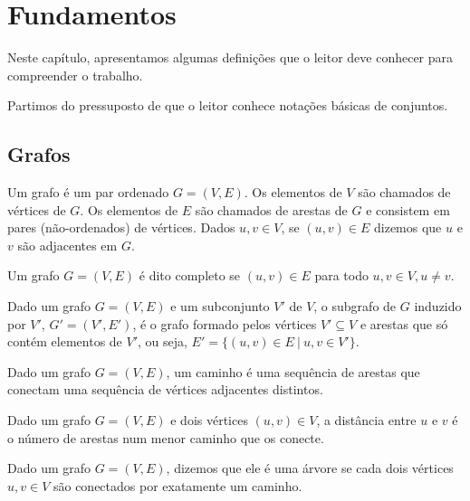 \chapter{Fundamentos}
\label{cap:fundamentos}

Neste capítulo, apresentamos algumas definições que o leitor deve conhecer para compreender o trabalho.

Partimos do pressuposto de que o leitor conhece notações básicas de conjuntos.

\section{Grafos}

\begin{definition}[grafo]
  \cite{bondy}
  Um grafo é um par ordenado $G = (V, E)$. Os elementos de $V$ são chamados de vértices de $G$. Os elementos de $E$ são chamados de arestas de $G$ e consistem em pares (não-ordenados) de vértices. Dados $u, v \in V$, se $(u, v) \in E$ dizemos que $u$ e $v$ são adjacentes em $G$.
\end{definition}

\begin{definition}
  \cite{bondy}
  Um grafo $G = (V, E)$ é dito completo se $(u, v) \in E$ para todo $u, v \in V, u \neq v$.
\end{definition}

\begin{definition}
  \cite{bondy}
  Dado um grafo $G = (V, E)$ e um subconjunto $V'$ de $V$, o subgrafo de $G$ induzido por $V'$, $G' = (V', E')$, é o grafo formado pelos vértices $V' \subseteq V$ e arestas que só contém elementos de $V'$, ou seja, $E' = \{(u, v) \in E \ | \  u, v \in V'\}$.
\end{definition}

\begin{definition}[caminho]
  \cite{bondy}
  Dado um grafo $G = (V, E)$, um caminho é uma sequência de arestas que conectam uma sequência de vértices adjacentes distintos.
\end{definition}

\begin{definition}[distância]
  \cite{bondy}
  Dado um grafo $G = (V, E)$ e dois vértices $(u, v) \in V$, a distância entre $u$ e $v$ é o número de arestas num menor caminho que os conecte.
\end{definition}

\begin{definition}[árvore]
  \cite{bondy}
  Dado um grafo $G = (V, E)$, dizemos que ele é uma árvore se cada dois vértices $u, v \in V$ são conectados por exatamente um caminho.
\end{definition}

